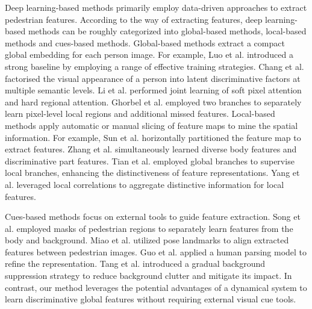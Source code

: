 \documentclass[12pt]{spieman}  %
\begin{document}
\begin{spacing}{2}
		Deep learning-based methods primarily employ data-driven approaches to extract pedestrian features. According to the way of extracting features, deep learning-based methods can be roughly categorized into global-based methods, local-based methods and cues-based methods. Global-based methods extract a compact global embedding for each person image. For example, Luo et al. \cite{luo2019bag} introduced a strong baseline by employing a range of effective training strategies. Chang et al. \cite{chang2018multi}  factorised the visual appearance of a person into latent discriminative factors at multiple semantic levels. Li et al. \cite{li2018harmonious} performed joint learning of soft pixel attention and hard regional attention. Ghorbel et al. \cite{ghorbel2022masking} employed two branches to separately learn pixel-level local regions and additional missed features. Local-based methods apply automatic or manual slicing of feature maps to mine the spatial information. For example, Sun et al. \cite{sun2018beyond} horizontally partitioned the feature map to extract features. Zhang et al. \cite{zhang2021appearance} simultaneously learned diverse body features and discriminative part features. Tian et al. \cite{tian2023self} employed global branches to supervise local branches, enhancing the distinctiveness of feature representations. Yang et al. \cite{yan2023part} leveraged local correlations to aggregate distinctive information for local features.
		
		Cues-based methods focus on external tools to guide feature extraction. Song et al. \cite{song2018mask} employed masks of pedestrian regions to separately learn features from the body and background. Miao et al. \cite{miao2019pose} utilized pose landmarks to align extracted features between pedestrian images. Guo et al. \cite{guo2019beyond} applied a human parsing model to refine the representation. Tang et al. \cite{tang2020person} introduced a gradual background suppression strategy to reduce background clutter and mitigate its impact. In contrast, our method leverages the potential advantages of a dynamical system to learn discriminative global features without requiring external visual cue tools.
		

\end{spacing}
\end{document}
